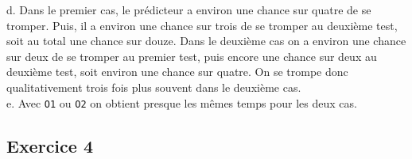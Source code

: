 \documentclass[11pt, a4 paper]{article}
\begin{document}
d. Dans le premier cas, le prédicteur a environ une chance sur quatre de se tromper. Puis, il a environ une chance sur trois de se tromper au deuxième test, soit au total une chance sur douze.
Dans le deuxième cas on a environ une chance sur deux de se tromper au premier test, puis encore une chance sur deux au deuxième test, soit environ une chance sur quatre.
On se trompe donc qualitativement trois fois plus souvent dans le deuxième cas.\\

e. Avec \texttt{O1} ou \texttt{O2} on obtient presque les mêmes temps pour les deux cas.\\

\subsection{Exercice 4}


\end{document}
